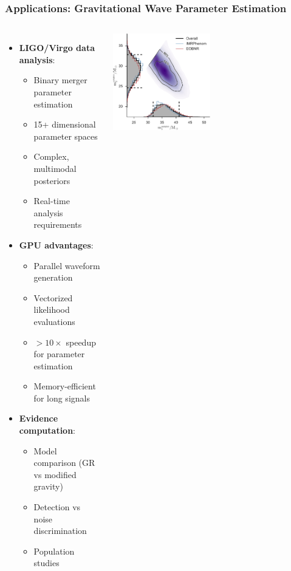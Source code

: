 \documentclass[aspectratio=169]{beamer}
\begin{document}
\begin{frame}
    \frametitle{Applications: Gravitational Wave Parameter Estimation}
    \begin{columns}
        \begin{itemize}
            \item \textbf{LIGO/Virgo data analysis}:
                \begin{itemize}
                    \item Binary merger parameter estimation
                    \item 15+ dimensional parameter spaces
                    \item Complex, multimodal posteriors
                    \item Real-time analysis requirements
                \end{itemize}
            \item \textbf{GPU advantages}:
                \begin{itemize}
                    \item Parallel waveform generation
                    \item Vectorized likelihood evaluations
                    \item $>10\times$ speedup for parameter estimation
                    \item Memory-efficient for long signals
                \end{itemize}
            \item \textbf{Evidence computation}:
                \begin{itemize}
                    \item Model comparison (GR vs modified gravity)
                    \item Detection vs noise discrimination
                    \item Population studies
                \end{itemize}
        \end{itemize}
        \includegraphics[width=0.49\textwidth]{figures/ligo_m1_m2}

\end{columns}
\end{frame}
\end{document}
